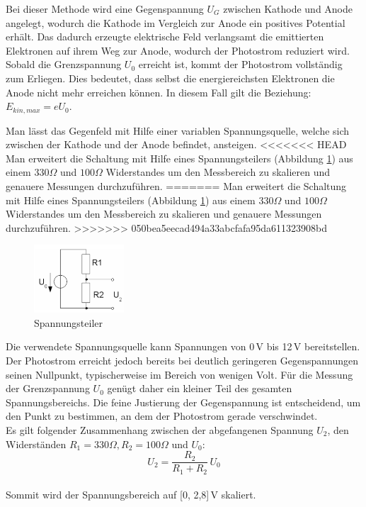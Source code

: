 Bei dieser Methode wird eine Gegenspannung $U_G$ zwischen Kathode und Anode angelegt, wodurch die Kathode im Vergleich zur Anode ein positives Potential erhält.
Das dadurch erzeugte elektrische Feld verlangsamt die emittierten Elektronen auf ihrem Weg zur Anode, wodurch der Photostrom reduziert wird. Sobald die Grenzspannung $U_0$ erreicht ist, kommt der Photostrom vollständig zum Erliegen. 
Dies bedeutet, dass selbst die energiereichsten Elektronen die Anode nicht mehr erreichen können. In diesem Fall gilt die Beziehung: 
$E_{kin,max} = eU_0$.

Man lässt das Gegenfeld mit Hilfe einer variablen Spannungsquelle, welche sich zwischen der Kathode und der Anode befindet, ansteigen.
<<<<<<< HEAD
Man erweitert die Schaltung mit Hilfe eines Spannungsteilers (Abbildung \cref{fig:spannungsteiler}) aus einem $330\Omega$ und $100\Omega$ Widerstandes um den Messbereich zu skalieren und genauere Messungen durchzuführen.
=======
Man erweitert die Schaltung mit Hilfe eines Spannungsteilers (Abbildung \ref{fig:spannungsteiler}) aus einem $330\Omega$ und $100\Omega$ Widerstandes um den Messbereich zu skalieren und genauere Messungen durchzuführen.
>>>>>>> 050bea5eecad494a33abcfafa95da611323908bd
\begin{figure}[htbp]
    \centering
    \includegraphics[width=0.3\textwidth]{figs/Spannungsteiler.png}
    \caption{ Spannungsteiler \cite{Spannungsteiler}}
    \label{fig:spannungsteiler}
\end{figure}
\FloatBarrier
Die verwendete Spannungsquelle kann Spannungen von 0\,V bis 12\,V bereitstellen. 
Der Photostrom erreicht jedoch bereits bei deutlich geringeren Gegenspannungen seinen Nullpunkt, typischerweise im Bereich von wenigen Volt. 
Für die Messung der Grenzspannung $U_0$ genügt daher ein kleiner Teil des gesamten Spannungsbereichs. 
Die feine Justierung der Gegenspannung ist entscheidend, um den Punkt zu bestimmen, an dem der Photostrom gerade verschwindet.\\
Es gilt folgender Zusammenhang zwischen der abgefangenen Spannung $U_2$, den Widerständen $R_1 = 330 \Omega, R_2 = 100 \Omega$ und $U_0$:
\begin{equation}
  U_2 = \frac{R_2}{R_1 + R_2}\,U_0
\end{equation}\\
Sommit wird der Spannungsbereich auf [0, 2{,}8]\,V skaliert.\\


